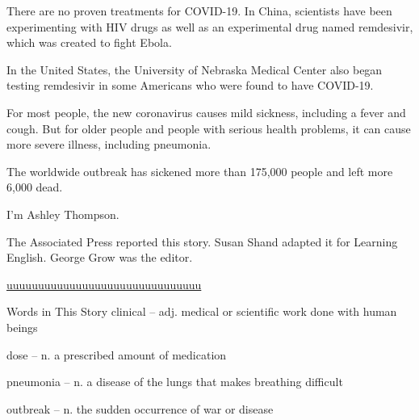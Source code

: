 There are no proven treatments for COVID-19. In China, scientists have been experimenting with HIV drugs as well as an experimental drug named remdesivir, which was created to fight Ebola.

In the United States, the University of Nebraska Medical Center also began testing remdesivir in some Americans who were found to have COVID-19.

For most people, the new coronavirus causes mild sickness, including a fever and cough. But for older people and people with serious health problems, it can cause more severe illness, including pneumonia.

The worldwide outbreak has sickened more than 175,000 people and left more 6,000 dead.

I'm Ashley Thompson.

The Associated Press reported this story. Susan Shand adapted it for Learning English. George Grow was the editor.\newline

\underline{uuuuuuuuuuuuuuuuuuuuuuuuuuuuuuu}

Words in This Story
clinical – adj. medical or scientific work done with human beings

dose – n. a prescribed amount of medication

pneumonia – n. a disease of the lungs that makes breathing difficult

outbreak – n. the sudden occurrence of war or disease

